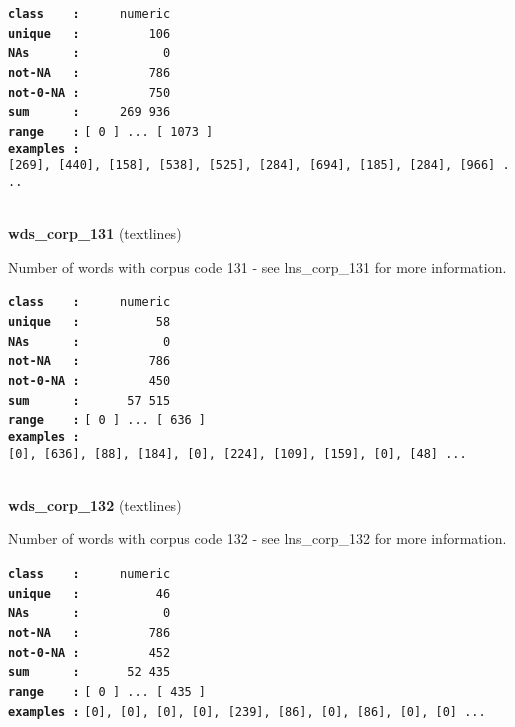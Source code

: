 \documentclass[]{article}
\begin{document}
\textbf{\texttt{class\ \ \ \ :}} \texttt{~~~~~numeric}\\
\textbf{\texttt{unique\ \ \ :}} \texttt{~~~~~~~~~106}\\
\textbf{\texttt{NAs\ \ \ \ \ \ :}} \texttt{~~~~~~~~~~~0}\\
\textbf{\texttt{not-NA\ \ \ :}} \texttt{~~~~~~~~~786}\\
\textbf{\texttt{not-0-NA\ :}} \texttt{~~~~~~~~~750}\\
\textbf{\texttt{sum\ \ \ \ \ \ :}} \texttt{~~~~~269~936}\\
\textbf{\texttt{range\ \ \ \ :}}
\texttt{{[}\ 0\ {]}\ ...\ {[}\ 1073\ {]}}\\
\textbf{\texttt{examples\ :}}
\texttt{{[}269{]},\ {[}440{]},\ {[}158{]},\ {[}538{]},\ {[}525{]},\ {[}284{]},\ {[}694{]},\ {[}185{]},\ {[}284{]},\ {[}966{]}\ ...}\\

~

\textbf{wds\_corp\_131} (textlines)

Number of words with corpus code 131 - see lns\_corp\_131 for more
information.

\textbf{\texttt{class\ \ \ \ :}} \texttt{~~~~~numeric}\\
\textbf{\texttt{unique\ \ \ :}} \texttt{~~~~~~~~~~58}\\
\textbf{\texttt{NAs\ \ \ \ \ \ :}} \texttt{~~~~~~~~~~~0}\\
\textbf{\texttt{not-NA\ \ \ :}} \texttt{~~~~~~~~~786}\\
\textbf{\texttt{not-0-NA\ :}} \texttt{~~~~~~~~~450}\\
\textbf{\texttt{sum\ \ \ \ \ \ :}} \texttt{~~~~~~57~515}\\
\textbf{\texttt{range\ \ \ \ :}}
\texttt{{[}\ 0\ {]}\ ...\ {[}\ 636\ {]}}\\
\textbf{\texttt{examples\ :}}
\texttt{{[}0{]},\ {[}636{]},\ {[}88{]},\ {[}184{]},\ {[}0{]},\ {[}224{]},\ {[}109{]},\ {[}159{]},\ {[}0{]},\ {[}48{]}\ ...}\\

~

\textbf{wds\_corp\_132} (textlines)

Number of words with corpus code 132 - see lns\_corp\_132 for more
information.

\textbf{\texttt{class\ \ \ \ :}} \texttt{~~~~~numeric}\\
\textbf{\texttt{unique\ \ \ :}} \texttt{~~~~~~~~~~46}\\
\textbf{\texttt{NAs\ \ \ \ \ \ :}} \texttt{~~~~~~~~~~~0}\\
\textbf{\texttt{not-NA\ \ \ :}} \texttt{~~~~~~~~~786}\\
\textbf{\texttt{not-0-NA\ :}} \texttt{~~~~~~~~~452}\\
\textbf{\texttt{sum\ \ \ \ \ \ :}} \texttt{~~~~~~52~435}\\
\textbf{\texttt{range\ \ \ \ :}}
\texttt{{[}\ 0\ {]}\ ...\ {[}\ 435\ {]}}\\
\textbf{\texttt{examples\ :}}
\texttt{{[}0{]},\ {[}0{]},\ {[}0{]},\ {[}0{]},\ {[}239{]},\ {[}86{]},\ {[}0{]},\ {[}86{]},\ {[}0{]},\ {[}0{]}\ ...}\\
\end{document}
